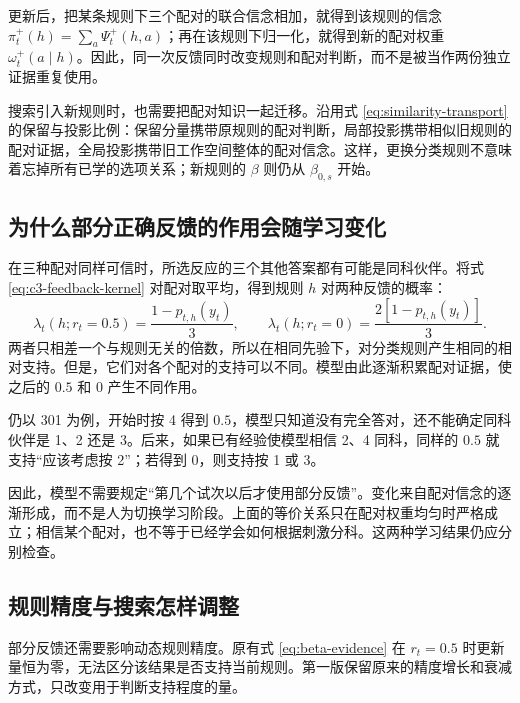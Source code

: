 \documentclass[12pt]{article}
\begin{document}
更新后，把某条规则下三个配对的联合信念相加，就得到该规则的信念 $\pi_t^{+}(h)=\sum_a\Psi_t^{+}(h,a)$；再在该规则下归一化，就得到新的配对权重 $\omega_t^{+}(a\mid h)$。因此，同一次反馈同时改变规则和配对判断，而不是被当作两份独立证据重复使用。

搜索引入新规则时，也需要把配对知识一起迁移。沿用式 \eqref{eq:similarity-transport} 的保留与投影比例：保留分量携带原规则的配对判断，局部投影携带相似旧规则的配对证据，全局投影携带旧工作空间整体的配对信念。这样，更换分类规则不意味着忘掉所有已学的选项关系；新规则的 $\beta$ 则仍从 $\beta_{0,s}$ 开始。

\subsection{为什么部分正确反馈的作用会随学习变化}

在三种配对同样可信时，所选反应的三个其他答案都有可能是同科伙伴。将式 \eqref{eq:c3-feedback-kernel} 对配对取平均，得到规则 $h$ 对两种反馈的概率：
\begin{equation}
\lambda_t(h;r_t=0.5)=\frac{1-p_{t,h}(y_t)}{3},\qquad
\lambda_t(h;r_t=0)=\frac{2[1-p_{t,h}(y_t)]}{3}.
\label{eq:c3-initial-equivalence}
\end{equation}
两者只相差一个与规则无关的倍数，所以在相同先验下，对分类规则产生相同的相对支持。但是，它们对各个配对的支持可以不同。模型由此逐渐积累配对证据，使之后的 $0.5$ 和 0 产生不同作用。

仍以 301 为例，开始时按 4 得到 $0.5$，模型只知道没有完全答对，还不能确定同科伙伴是 1、2 还是 3。后来，如果已有经验使模型相信 2、4 同科，同样的 $0.5$ 就支持“应该考虑按 2”；若得到 0，则支持按 1 或 3。

因此，模型不需要规定“第几个试次以后才使用部分反馈”。变化来自配对信念的逐渐形成，而不是人为切换学习阶段。上面的等价关系只在配对权重均匀时严格成立；相信某个配对，也不等于已经学会如何根据刺激分科。这两种学习结果仍应分别检查。

\subsection{规则精度与搜索怎样调整}
\label{sec:condition3-beta}

部分反馈还需要影响动态规则精度。原有式 \eqref{eq:beta-evidence} 在 $r_t=0.5$ 时更新量恒为零，无法区分该结果是否支持当前规则。第一版保留原来的精度增长和衰减方式，只改变用于判断支持程度的量。
\end{document}
